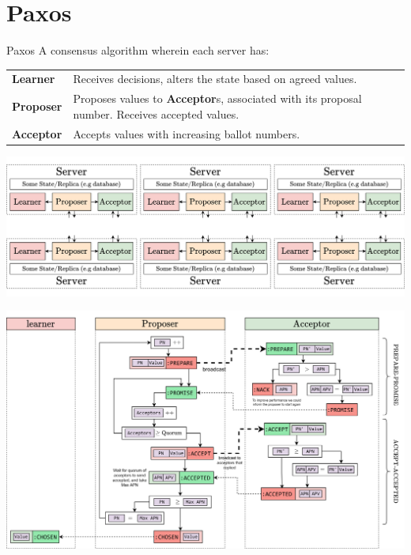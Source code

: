 \section{Paxos}
\begin{definitionbox}{Paxos}
    A consensus algorithm wherein each server has:
    \begin{center}
        \begin{tabular}{l p{}}
            \textbf{Learner} & Receives decisions, alters the state based on agreed values. \\
            \textbf{Proposer} & Proposes values to \textbf{Acceptor}s, associated with its proposal number. Receives accepted values. \\
            \textbf{Acceptor} & Accepts values with increasing ballot numbers. \\
        \end{tabular}
    \end{center}
\end{definitionbox}
\begin{center}
    \includegraphics[width=\textwidth]{consensus/images/paxos_servers.drawio.png}
\end{center}

\begin{center}
    \includegraphics[width=\textwidth]{consensus/images/paxos_stages.drawio.png}
\end{center}
\unfinished


